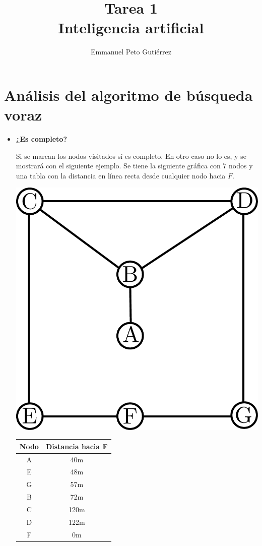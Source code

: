 \documentclass{article}
\title{Tarea 1\\Inteligencia artificial}
\author{Emmanuel Peto Gutiérrez}
\begin{document}
\maketitle

\section*{Análisis del algoritmo de búsqueda voraz}

\begin{itemize}
\item \textbf{¿Es completo?}

Si se marcan los nodos visitados sí es completo. En otro caso no lo es, y se mostrará con el siguiente ejemplo. Se tiene la siguiente gráfica con 7 nodos y una tabla con la distancia en línea recta desde cualquier nodo hacia $F$.

\begin{centering}
\includegraphics[scale=0.3]{grafica1}
\hspace{5mm}
\begin{tabular}{|c|c|}
\hline
\textbf{Nodo} & \textbf{Distancia hacia F}\\ \hline
A & 40m \\ \hline
E & 48m \\ \hline
G & 57m \\ \hline
B & 72m \\ \hline
C & 120m \\ \hline
D & 122m\\ \hline
F & 0m \\ \hline
\end{tabular}
\end{centering}


\end{itemize}
\end{document}
